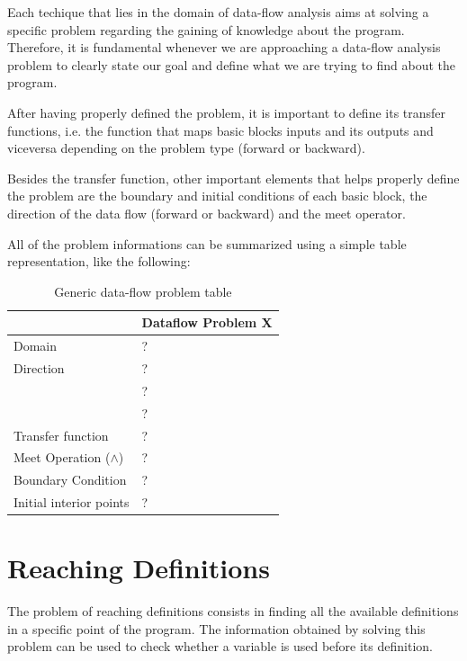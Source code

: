 \documentclass{article}
\begin{document}
 Each techique that lies in the domain of data-flow analysis aims at solving a specific problem regarding the gaining of knowledge about the program. Therefore, it is fundamental whenever we are approaching a data-flow analysis problem to clearly state our goal and define what we are trying to find about the program.

 After having properly defined the problem, it is important to define its transfer functions, i.e. the function that maps basic blocks inputs and its outputs and viceversa depending on the problem type (forward or backward).

 Besides the transfer function, other important elements that helps properly define the problem are the boundary and initial conditions of each basic block, the direction of the data flow (forward or backward) and the meet operator.

 All of the problem informations can be summarized using a simple table representation, like the following:

\begin{table}[H]
\centering
\begin{tabular}{|p{}|p{}|}
\hline
 & \textbf{Dataflow Problem X} \\
\hline
Domain & ? \\
\hline
Direction & ? \\
 & ? \\
 & ? \\
\hline
Transfer function & ? \\
\hline
Meet Operation ($\wedge$) & ? \\
\hline
Boundary Condition & ? \\
\hline
Initial interior points & ? \\
\hline
\end{tabular}
\caption{Generic data-flow problem table}
\label{tab:dataflow_problem_x}
\end{table}

\clearpage

\section{Reaching Definitions}

The problem of reaching definitions consists in finding all the available definitions in a specific point of the program. The information obtained by solving this problem can be used to check whether a variable is used before its definition.
\end{document}
